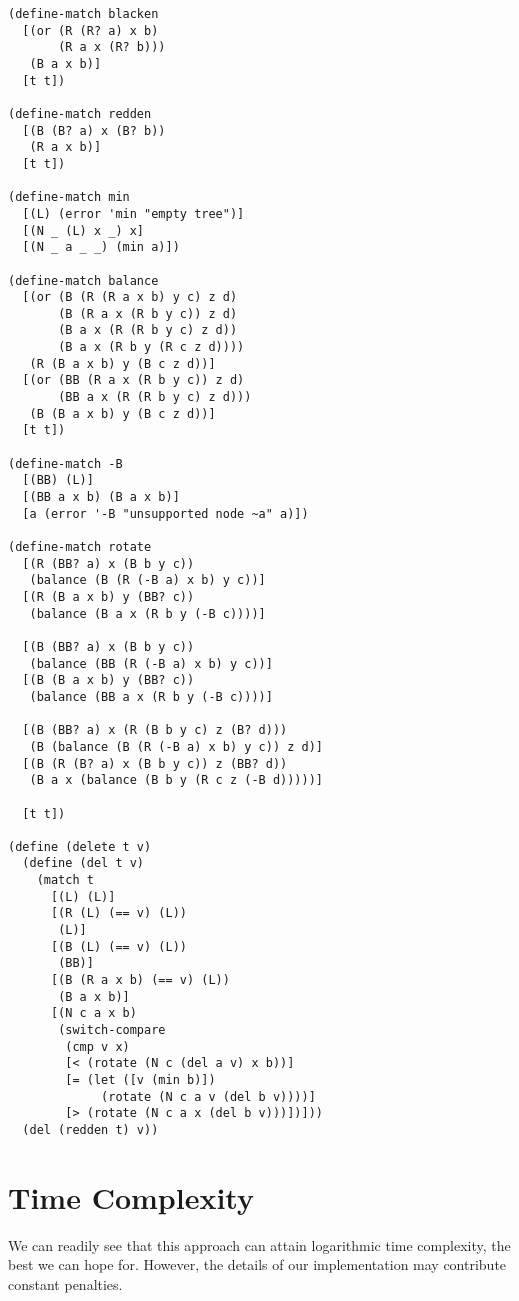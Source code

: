 \documentclass[preprint]{sigplanconf}
\begin{document}
\begin{verbatim}
(define-match blacken
  [(or (R (R? a) x b)
       (R a x (R? b)))
   (B a x b)]
  [t t])

(define-match redden
  [(B (B? a) x (B? b))
   (R a x b)]
  [t t])

(define-match min
  [(L) (error 'min "empty tree")]
  [(N _ (L) x _) x]
  [(N _ a _ _) (min a)])

(define-match balance
  [(or (B (R (R a x b) y c) z d)
       (B (R a x (R b y c)) z d)
       (B a x (R (R b y c) z d))
       (B a x (R b y (R c z d))))
   (R (B a x b) y (B c z d))]
  [(or (BB (R a x (R b y c)) z d)
       (BB a x (R (R b y c) z d)))
   (B (B a x b) y (B c z d))]
  [t t])

(define-match -B
  [(BB) (L)]
  [(BB a x b) (B a x b)]
  [a (error '-B "unsupported node ~a" a)])

(define-match rotate
  [(R (BB? a) x (B b y c))
   (balance (B (R (-B a) x b) y c))]
  [(R (B a x b) y (BB? c))
   (balance (B a x (R b y (-B c))))]
    
  [(B (BB? a) x (B b y c))
   (balance (BB (R (-B a) x b) y c))]
  [(B (B a x b) y (BB? c))
   (balance (BB a x (R b y (-B c))))]
    
  [(B (BB? a) x (R (B b y c) z (B? d)))
   (B (balance (B (R (-B a) x b) y c)) z d)]
  [(B (R (B? a) x (B b y c)) z (BB? d))
   (B a x (balance (B b y (R c z (-B d)))))]
    
  [t t])

(define (delete t v)
  (define (del t v)
    (match t
      [(L) (L)]
      [(R (L) (== v) (L))
       (L)]
      [(B (L) (== v) (L))
       (BB)]
      [(B (R a x b) (== v) (L))
       (B a x b)]
      [(N c a x b)
       (switch-compare
        (cmp v x)
        [< (rotate (N c (del a v) x b))]
        [= (let ([v (min b)])
             (rotate (N c a v (del b v))))]
        [> (rotate (N c a x (del b v)))])]))
  (del (redden t) v))
\end{verbatim}

\section{Time Complexity}

We can readily see that this approach can attain logarithmic time complexity, the best we can hope for. However, the details of our implementation may contribute constant penalties.
\end{document}
